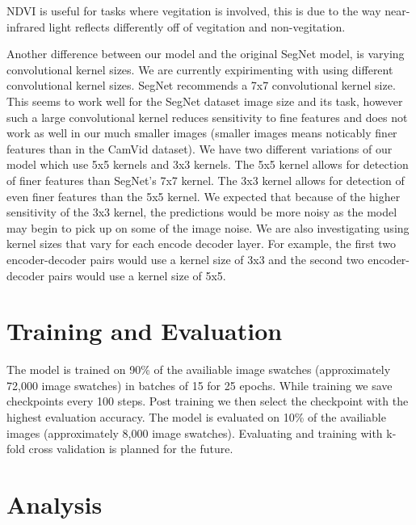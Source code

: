 \documentclass[12pt]{article}
\begin{document}
NDVI is useful for tasks where vegitation is involved, this is due to the way near-infrared light reflects differently off of vegitation and non-vegitation.

Another difference between our model and the original SegNet model, is varying convolutional kernel sizes. We are currently expirimenting with using different convolutional kernel sizes. SegNet recommends a 7x7 convolutional kernel size. This seems to work well for the SegNet dataset image size and its task, however such a large convolutional kernel reduces sensitivity to fine features and does not work as well in our much smaller images (smaller images means noticably finer features than in the CamVid dataset). We have two different variations of our model which use 5x5 kernels and 3x3 kernels. The 5x5 kernel allows for detection of finer features than SegNet's 7x7 kernel. The 3x3 kernel allows for detection of even finer features than the 5x5 kernel. We expected that because of the higher sensitivity of the 3x3 kernel, the predictions would be more noisy as the model may begin to pick up on some of the image noise. We are also investigating using kernel sizes that vary for each encode decoder layer. For example, the first two encoder-decoder pairs would use a kernel size of 3x3 and the second two encoder-decoder pairs would use a kernel size of 5x5.

\section{Training and Evaluation}
The model is trained on 90\% of the availiable image swatches (approximately 72,000 image swatches) in batches of 15 for 25 epochs. While training we save checkpoints every 100 steps. Post training we then select the checkpoint with the highest evaluation accuracy. The model is evaluated on 10\% of the availiable images (approximately 8,000 image swatches). Evaluating and training with k-fold cross validation is planned for the future.

\section{Analysis}

\begin{figure}
\end{figure}
\end{document}
